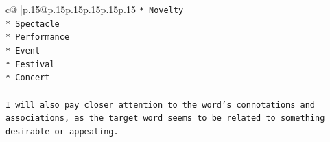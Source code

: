 \documentclass{article}
\begin{document}
{\begin{supertabular}{c@{$\;$}|p{.15\linewidth}@{}p{.15\linewidth}p{.15\linewidth}p{.15\linewidth}p{.15\linewidth}p{.15\linewidth}}
{{{\texttt{* Novelty} \\
\texttt{* Spectacle} \\
\texttt{* Performance} \\
\texttt{* Event} \\
\texttt{* Festival} \\
\texttt{* Concert} \\
\\ 
\texttt{I will also pay closer attention to the word's connotations and associations, as the target word seems to be related to something desirable or appealing.} \\
            }
        }
    }
     \\ \\

\end{supertabular}
}
\end{document}
